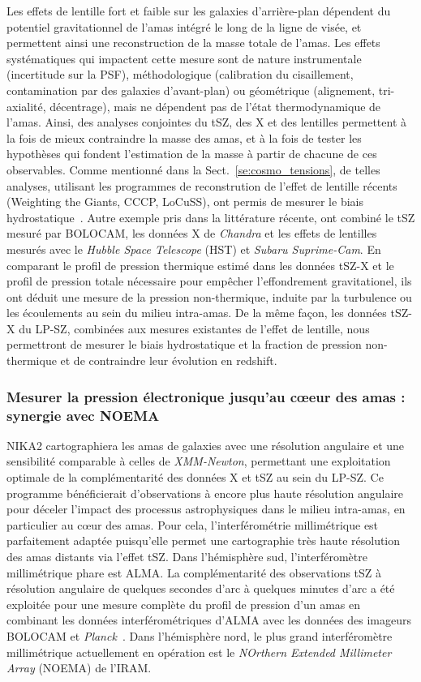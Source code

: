 Les effets de lentille fort et faible sur les galaxies d'arrière-plan
dépendent du potentiel gravitationnel de l'amas intégré le long de la
ligne de visée, et permettent ainsi une reconstruction de la masse
totale de l'amas. Les effets systématiques qui impactent cette mesure
sont de nature instrumentale (incertitude sur la PSF), méthodologique
(calibration du cisaillement, contamination par des galaxies
d'avant-plan) ou géométrique (alignement, tri-axialité, décentrage),
mais ne dépendent pas de l'état thermodynamique de l'amas. Ainsi, des
analyses conjointes du tSZ, des X et des lentilles
permettent à la fois de mieux contraindre la masse des amas, et à la
fois de tester les hypothèses qui fondent l'estimation de la masse à
partir de chacune de ces observables. Comme mentionné dans la
Sect.~\ref{se:cosmo_tensions}, de telles analyses, utilisant les
programmes de reconstrution de l'effet de lentille récents (Weighting
the Giants, CCCP, LoCuSS), ont permis de mesurer le biais
hydrostatique~\citep[voir][pour une compilation des
  résultats]{Salvati2018, Osato2019}. Autre exemple pris dans la littérature
récente, \citet{Siegel2018} ont combiné le tSZ mesuré par BOLOCAM, les
données X de \emph{Chandra} et les effets de lentilles mesurés avec le
\emph{Hubble Space Telescope} (HST) et \emph{Subaru Suprime-Cam}. En
comparant le profil de pression thermique estimé dans les données
tSZ-X et le profil de pression totale nécessaire pour empêcher
l'effondrement gravitationel, ils ont déduit une mesure de la pression
non-thermique, induite par la turbulence ou les écoulements au sein du
milieu intra-amas. De la même façon, les données tSZ-X du LP-SZ,
combinées aux mesures existantes de l'effet de lentille, nous
permettront de mesurer le biais hydrostatique et la fraction de pression
non-thermique et de contraindre leur évolution en redshift.  

\subsubsection{Mesurer la pression électronique jusqu'au c\oe eur des
  amas : synergie avec NOEMA}

NIKA2 cartographiera les amas de galaxies avec une résolution angulaire
et une sensibilité comparable à celles de \emph{XMM-Newton},
permettant une exploitation optimale de la complémentarité des données
X et tSZ au sein du LP-SZ. Ce programme bénéficierait d'observations à
encore plus haute résolution angulaire pour déceler l'impact des
processus astrophysiques dans le milieu intra-amas, en particulier au
c\oe ur des amas. Pour cela, l'interférométrie millimétrique est
parfaitement adaptée puisqu'elle permet une cartographie très haute
résolution des amas distants via l'effet tSZ. Dans l'hémisphère sud,
l'interféromètre millimétrique phare est ALMA. La complémentarité des
observations tSZ à résolution angulaire de quelques secondes d'arc à
quelques minutes d'arc a été exploitée pour une mesure complète du
profil de pression d'un amas en combinant les données
interférométriques d'ALMA avec les données des imageurs BOLOCAM et
\emph{Planck}~\citep{DiMascolo2019}. Dans l'hémisphère nord, le plus
grand interféromètre millimétrique actuellement en opération est le
\emph{NOrthern Extended Millimeter Array} (NOEMA) de l'IRAM.

